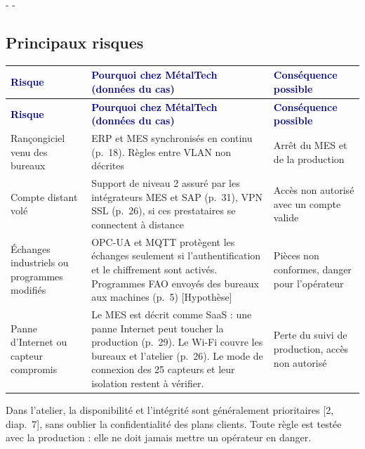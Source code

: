 \documentclass[11pt,a4paper]{article}
\makeatletter
\newcommand{\needsp}[1]{\par\penalty\z@\begingroup\setlength{\dimen@}{#1}\dimen@ii\pagegoal\advance\dimen@ii-\pagetotal
  \ifdim\dimen@>\dimen@ii\ifdim\dimen@ii>\z@\vfil\fi\penalty-\@M\fi\endgroup}
\newcommand{\thd}[1]{\textbf{\textcolor{navy}{#1}}}
\newcommand{\tagH}{\textsf{\footnotesize[Hypothèse]}}
\makeatother
\begin{document}
\needsp{12\baselineskip}
\subsection*{Principaux risques}
\begin{xltabular}{\linewidth}{@{}P{44mm}YP{42mm}@{}}\toprule
\thd{Risque} & \thd{Pourquoi chez MétalTech (données du cas)} & \thd{Conséquence possible}\\\midrule\endfirsthead
\toprule \thd{Risque} & \thd{Pourquoi chez MétalTech (données du cas)} & \thd{Conséquence possible}\\\midrule\endhead
\bottomrule\endfoot
Rançongiciel venu des bureaux & ERP et MES synchronisés en continu (p.~18). Règles entre VLAN non décrites & Arrêt du MES et de la production\\
Compte distant volé & Support de niveau 2 assuré par les intégrateurs MES et SAP (p.~31), VPN SSL (p.~26), si ces prestataires se connectent à distance & Accès non autorisé avec un compte valide\\
Échanges industriels ou programmes modifiés & OPC-UA et MQTT protègent les échanges seulement si l'authentification et le chiffrement sont activés. Programmes FAO envoyés des bureaux aux machines (p.~5) \tagH & Pièces non conformes, danger pour l'opérateur\\
Panne d'Internet ou capteur compromis & Le MES est décrit comme SaaS : une panne Internet peut toucher la production (p.~29). Le Wi-Fi couvre les bureaux et l'atelier (p.~26). Le mode de connexion des 25 capteurs et leur isolation restent à vérifier. & Perte du suivi de production, accès non autorisé\\
\end{xltabular}
Dans l'atelier, la disponibilité et l'intégrité sont généralement prioritaires [2, diap.~7], sans oublier la confidentialité des plans clients. Toute règle est testée avec la production : elle ne doit jamais mettre un opérateur en danger.
\end{document}
